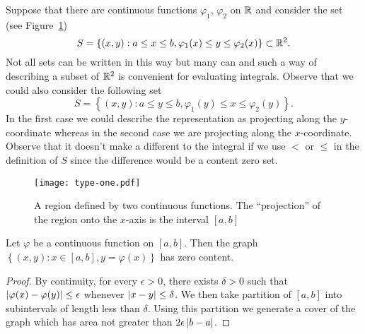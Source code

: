 Suppose that there are continuous functions \(\varphi_1\), \(\varphi_2\) on \(\mathbb{R}\) and consider the set (see Figure~\ref{fig:type-one})
\[
    S = \left\{(x,y): a \leq x \leq b, \varphi_1(x) \leq y \leq \varphi_2(x)\right\} \subset \mathbb{R}^2.
\]
Not all sets can be written in this way but many can and such a way of describing a subset of \(\mathbb{R}^2\) is convenient for evaluating integrals.
Observe that we could also consider the following set
\[
    S = \left\{(x,y): a \leq y \leq b, \varphi_1(y) \leq x \leq \varphi_2(y)\right\}.
\]
In the first case we could describe the representation as projecting along the \(y\)-coordinate whereas in the second case we are projecting along the \(x\)-coordinate.
Observe that it doesn't make a different to the integral if we use \(<\) or \(\leq\) in the definition of \(S\) since the difference would be a content zero set.
%
%
\begin{figure}
    \centering
    \texttt{[image: type-one.pdf]}
    \caption{A region defined by two continuous functions. The ``projection'' of the region onto the \(x\)-axis is the interval \([a,b]\)}%
    \label{fig:type-one}
\end{figure}
%
\begin{theorem*}
    Let \(\varphi\) be a continuous function on \([a,b]\).
    Then the graph
    \(\left\{(x,y): x\in [a,b], y=\varphi(x)\right\}\)
    has zero content.
\end{theorem*}
%
\begin{proof}
    By continuity, for every \(\epsilon>0\), there exists \(\delta>0\) such that \(\left|\varphi(x) - \varphi(y)\right|\leq \epsilon\) whenever \(\left|x-y\right|\leq \delta\).
    We then take partition of \([a,b]\) into subintervals of length less than \(\delta\).
    Using this partition we generate a cover of the graph which has area not greater than \(2\epsilon \left|b-a\right|\).
\end{proof}

